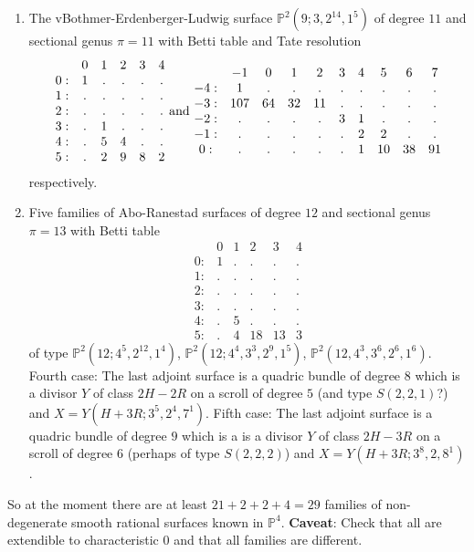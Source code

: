 \documentclass[twoside,12pt, leqno]{amsart}
\def\PP{{\mathbb P}}
\begin{document}
\begin{enumerate}
\item The vBothmer-Erdenberger-Ludwig surface $\PP^{2}(9;3,2^{14},1^{5})$ of degree $11$ and sectional genus $\pi=11$ with Betti table and Tate resolution
$$\begin{matrix}
       & 0 & 1 & 2 & 3 & 4\\
      0: & 1 & . & . & . & .\\
      1: & . & . & . & . & .\\
      2: & . & . & . & . & .\\
      3: & . & 1 & . & . & .\\
      4: & . & 5 & 4 & . & .\\
      5: & . & 2 & 9 & 8 & 2
      \end{matrix}
\hbox{ and  } 
\begin{matrix}
        & -1 & 0 & 1 & 2 & 3 & 4 & 5 & 6 & 7\\
       -4: & 1 & . & . & . & . & . & . & . & .\\
       -3: & 107 & 64 & 32 & 11 & . & . & . & . & .\\
       -2: & . & . & . & . & 3 & 1 & . & . & .\\
       -1: & . & . & . & . & . & 2 & 2 & . & .\\
       0: & . & . & . & . & . & 1 & 10 & 38 & 91
       \end{matrix}
$$
respectively.

\item\label{ARsurf} Five families of Abo-Ranestad surfaces of degree $12$ and sectional genus $\pi=13$ with Betti table
$$\begin{matrix}
       & 0 & 1 & 2 & 3 & 4\\
      0: & 1 & . & . & . & .\\
      1: & . & . & . & . & .\\
      2: & . & . & . & . & .\\
      3: & . & . & . & . & .\\
      4: & . & 5 & . & . & .\\
      5: & . & 4 & 18 & 13 & 3
      \end{matrix}$$
of type $\PP^{2}(12;4^{5},2^{12},1^{4})$, $\PP^{2}(12;4^{4},3^{3},2^{9},1^{5})$, $\PP^{2}(12,4^{3},3^{6},2^{6},1^{6})$.
Fourth case: The last adjoint surface is a quadric bundle of degree $8$ which is a divisor $Y$ of class $2H-2R$ on a scroll of degree $5$ (and type $S(2,2,1)$?) and
$X=Y(H+3R;3^{5},2^{4},7^{1})$.
Fifth case: The last adjoint surface is a quadric bundle of degree $9$ which is a is a divisor $Y$ of class $2H-3R$ on a scroll of degree $6$ (perhaps of type $S(2,2,2)$) and
$X=Y(H+3R;3^{8},2,8^{1})$.
\end{enumerate}

So at the moment there are at least $21+2+2+4=29$ families of non-degenerate  smooth rational surfaces known in $\PP^{4}$.
{\bf Caveat}: Check that all are extendible to characteristic 0 and that all families are different.
\end{document}
